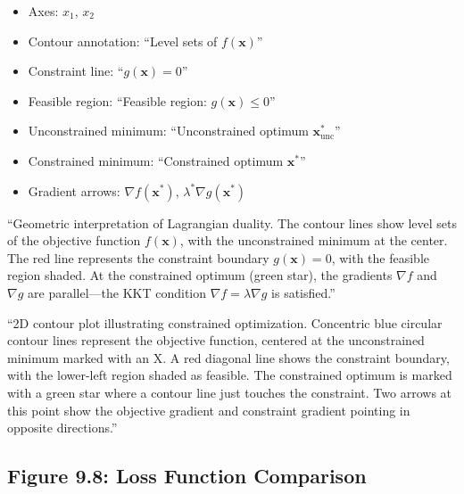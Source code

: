 \documentclass[12pt]{article}
\begin{document}
\begin{description}[style=nextline, leftmargin=0pt]
    \item[Required Labels]
    \begin{itemize}
        \item Axes: $x_1$, $x_2$
        \item Contour annotation: ``Level sets of $f(\mathbf{x})$''
        \item Constraint line: ``$g(\mathbf{x}) = 0$''
        \item Feasible region: ``Feasible region: $g(\mathbf{x}) \leq 0$''
        \item Unconstrained minimum: ``Unconstrained optimum $\mathbf{x}^*_{\text{unc}}$''
        \item Constrained minimum: ``Constrained optimum $\mathbf{x}^*$''
        \item Gradient arrows: $\nabla f(\mathbf{x}^*)$, $\lambda^* \nabla g(\mathbf{x}^*)$
    \end{itemize}

    \item[Caption Text]
    ``Geometric interpretation of Lagrangian duality. The contour lines show level sets of the objective function $f(\mathbf{x})$, with the unconstrained minimum at the center. The red line represents the constraint boundary $g(\mathbf{x}) = 0$, with the feasible region shaded. At the constrained optimum (green star), the gradients $\nabla f$ and $\nabla g$ are parallel---the KKT condition $\nabla f = \lambda \nabla g$ is satisfied.''

    \item[Alt-Text for Accessibility]
    ``2D contour plot illustrating constrained optimization. Concentric blue circular contour lines represent the objective function, centered at the unconstrained minimum marked with an X. A red diagonal line shows the constraint boundary, with the lower-left region shaded as feasible. The constrained optimum is marked with a green star where a contour line just touches the constraint. Two arrows at this point show the objective gradient and constraint gradient pointing in opposite directions.''
\end{description}

\newpage

\subsection{Figure 9.8: Loss Function Comparison}
\end{document}
